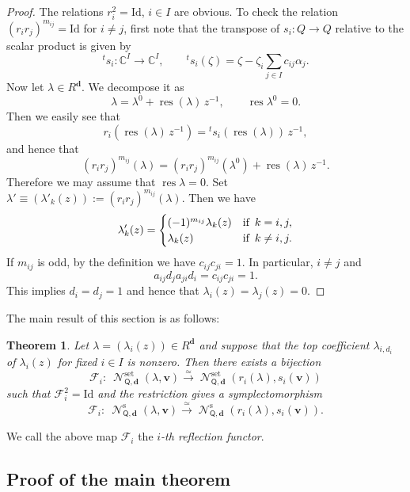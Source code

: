 \documentclass[pdftex]{sigma}
\numberwithin{equation}{section}
\newtheorem{Theorem}{Theorem}[section]
\theoremstyle{definition}
\newcommand{\C}{\mathbb{C}} %
\newcommand{\unit}{\mathrm{Id}}
\newcommand{\bv}{\mathbf{v}}
\newcommand{\res}{\operatorname*{res}}
\newcommand{\ved}{\mathbf{d}}
\newcommand{\hquad}{\hspace{.5em}}
\newcommand{\Qst}{\operatorname{\mathscr{N}}^\mathrm{s}}
\newcommand{\Qset}{\operatorname{\mathscr{N}}^\mathrm{set}}
\newcommand{\QQ}{\mathsf{Q}} %
\newcommand{\frF}{\mathscr{F}} %
\begin{document}
\begin{proof}
The relations $r_i^2 = \unit$, $i \in I$ are obvious.
To check the relation $(r_ir_j)^{m_{ij}}=\unit$ for $i\neq j$,
f\/irst note that the transpose of $s_i \colon Q \to Q$
relative to the scalar product is given by
\[
{}^t s_i \colon \C^I \to \C^I, \qquad
{}^t s_i (\zeta) = \zeta - \zeta_i\sum_{j \in I} c_{ij} \alpha_j.
\]
Now let $\lambda \in R^\ved$. We decompose it as
\[
\lambda = \lambda^0 + \res (\lambda)\,z^{-1},
\qquad \res \lambda^0 =0.
\]
Then we easily see that
\[
r_i(\res(\lambda)\,z^{-1})={}^t s_i (\res(\lambda))\,z^{-1},
\]
and hence that
\[
(r_ir_j)^{m_{ij}} (\lambda) = (r_ir_j)^{m_{ij}} (\lambda^0)
+ \res (\lambda)\,z^{-1}.
\]
Therefore we may assume that $\res \lambda =0$.
Set $\lambda' \equiv (\lambda'_k(z)) := (r_ir_j)^{m_{ij}}(\lambda)$.
Then we have
\[
\lambda'_k(z) =
\begin{cases}
(-1)^{m_{ij}} \lambda_k(z) & \text{if}\hquad k=i,j, \\
\lambda_k(z) & \text{if}\hquad k \neq i,j.
\end{cases}
\]
If $m_{ij}$ is odd, by the def\/inition we have
$c_{ij}c_{ji}=1$.
In particular, $i \neq j$ and
\[
a_{ij} d_j a_{ji} d_i = c_{ij} c_{ji} =1.
\]
This implies $d_i=d_j=1$ and hence that
$\lambda_i(z) = \lambda_j(z)=0$.
\end{proof}

The main result of this section is as follows:
\begin{Theorem}\label{thm:ref}
Let $\lambda=(\lambda_i(z)) \in R^\ved$ and suppose that
the top coefficient $\lambda_{i,d_i}$ of $\lambda_i(z)$
for fixed $i \in I$ is nonzero.
Then there exists a bijection
\[
\frF_i \colon \ \Qset_{\QQ,\ved}(\lambda,\bv) \xrightarrow{\simeq}
\Qset_{\QQ,\ved}(r_i(\lambda),s_i(\bv))
\]
such that $\frF_i^2 = \unit$
and the restriction gives a symplectomorphism
\[
\frF_i \colon \ \Qst_{\QQ,\ved}(\lambda,\bv) \xrightarrow{\simeq}
\Qst_{\QQ,\ved}(r_i(\lambda),s_i(\bv)).
\]
\end{Theorem}

We call the above map $\frF_i$
the {\em $i$-th reflection functor}.

\subsection{Proof of the main theorem}\label{subsec:proof}
\end{document}
